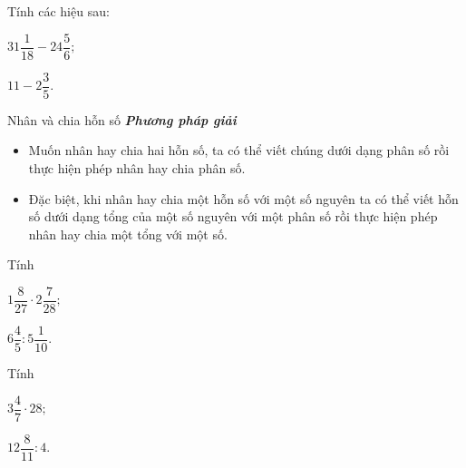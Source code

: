 \begin{vd} %
Tính các hiệu sau:
\begin{listEX}[2]
\item $31\dfrac{1}{18} - 24\dfrac{5}{6};$
\item $11 - 2\dfrac{3}{5}.$
\end{listEX} 
\end{vd}
\setcounter{vd}{0}
\begin{dang}{Nhân và chia hỗn số}
\textbf{\textit{Phương pháp giải}}
\begin{itemize}
\item Muốn nhân hay chia hai hỗn số, ta có thể viết chúng dưới dạng phân số rồi thực hiện phép nhân hay chia phân số.
\item Đặc biệt, khi nhân hay chia một hỗn số với một số nguyên ta có thể viết hỗn số dưới dạng tổng của một số nguyên với một phân số rồi thực hiện phép nhân hay chia một tổng với một số.
\end{itemize}
\end{dang}
\begin{vd} %
Tính
\begin{listEX}[2]
\item $1\dfrac{8}{27}\cdot2\dfrac{7}{28};$
\item $6\dfrac{4}{5}:5\dfrac{1}{10}.$
\end{listEX} 
\end{vd}
\begin{vd} %
Tính
\begin{listEX}[2]
\item $3\dfrac{4}{7}\cdot28;$
\item $12\dfrac{8}{11}: 4.$
\end{listEX}
\end{vd}
